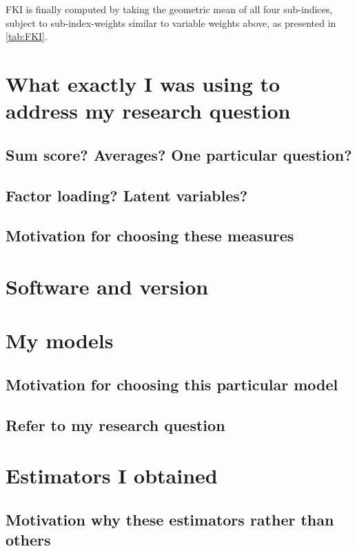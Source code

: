 \documentclass[a4paper,11pt,UKenglish,twoside,openright]{report}\usepackage[]{graphicx}\usepackage[]{color}
\begin{document}
FKI is finally computed by taking the geometric mean of all four sub-indices, subject to sub-index-weights similar to variable weights above, as presented in \cref{tab:FKI}.



\newpage

\section{What exactly I was using to address my research question}

\subsection{Sum score? Averages? One particular question?}

\subsection{Factor loading? Latent variables?}

\subsection{Motivation for choosing these measures}

\section{Software and version}

\section{My models}

\subsection{Motivation for choosing this particular model}

\subsection{Refer to my research question}

\section{Estimators I obtained}

\subsection{Motivation why these estimators rather than others}
\end{document}
